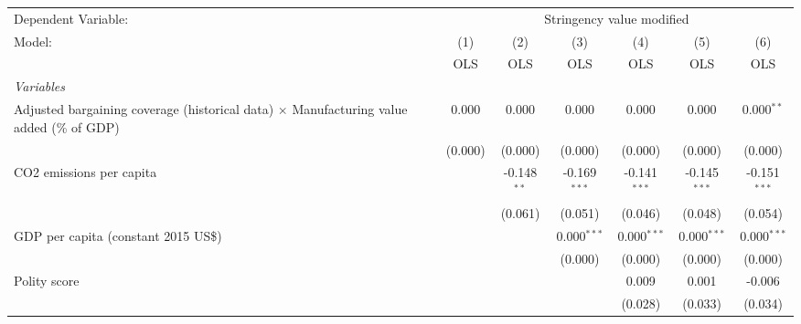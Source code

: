 
\begingroup
\centering
\begin{tabular}{lcccccc}
   \toprule
   Dependent Variable: & \multicolumn{6}{c}{Stringency value modified}\\
   Model:                                                                                          & (1)     & (2)           & (3)            & (4)            & (5)            & (6)\\  
                                                                                                   &  OLS    & OLS           & OLS            & OLS            & OLS            & OLS\\  
   \midrule
   \emph{Variables}\\
   Adjusted bargaining coverage (historical data) $\times$ Manufacturing value added (\% of GDP)   & 0.000   & 0.000         & 0.000          & 0.000          & 0.000          & 0.000$^{**}$\\   
                                                                                                   & (0.000) & (0.000)       & (0.000)        & (0.000)        & (0.000)        & (0.000)\\   
   CO2 emissions per capita                                                                        &         & -0.148$^{**}$ & -0.169$^{***}$ & -0.141$^{***}$ & -0.145$^{***}$ & -0.151$^{***}$\\   
                                                                                                   &         & (0.061)       & (0.051)        & (0.046)        & (0.048)        & (0.054)\\   
   GDP per capita (constant 2015 US\$)                                                             &         &               & 0.000$^{***}$  & 0.000$^{***}$  & 0.000$^{***}$  & 0.000$^{***}$\\   
                                                                                                   &         &               & (0.000)        & (0.000)        & (0.000)        & (0.000)\\   
   Polity score                                                                                    &         &               &                & 0.009          & 0.001          & -0.006\\   
                                                                                                   &         &               &                & (0.028)        & (0.033)        & (0.034)\\   

\end{tabular}
